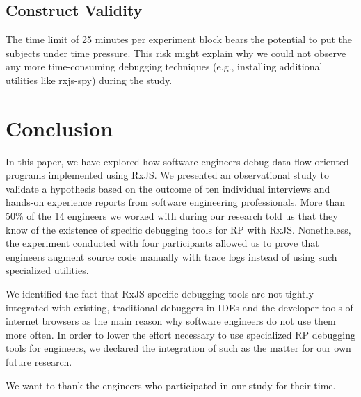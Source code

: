\documentclass[sigplan,screen,review]{acmart}
\begin{document}
\subsection{Construct Validity}

The time limit of 25 minutes per experiment block bears the potential to put the subjects under time pressure. This risk might explain why we could not observe any more time-consuming debugging techniques (e.g., installing additional utilities like rxjs-spy) during the study.


\section{Conclusion}
\label{sec:conclusion}

In this paper, we have explored how software engineers debug data-flow-oriented programs implemented using RxJS. We presented an observational study to validate a hypothesis based on the outcome of ten individual interviews and hands-on experience reports from software engineering professionals. More than 50\% of the 14 engineers we worked with during our research told us that they know of the existence of specific debugging tools for RP with RxJS. Nonetheless, the experiment conducted with four participants allowed us to prove that engineers augment source code manually with trace logs instead of using such specialized utilities.

We identified the fact that RxJS specific debugging tools are not tightly integrated with existing, traditional debuggers in IDEs and the developer tools of internet browsers as the main reason why software engineers do not use them more often. In order to lower the effort necessary to use specialized RP debugging tools for engineers, we declared the integration of such as the matter for our own future research.

\begin{acks}
	We want to thank the engineers who participated in our study for their time.
\end{acks}



\end{document}
